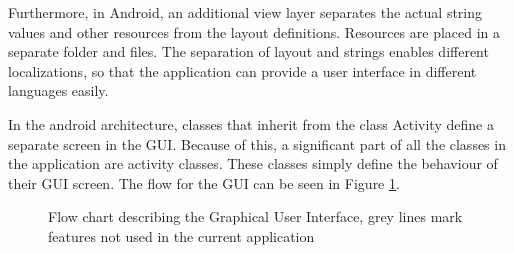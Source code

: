 Furthermore, in Android, an additional view layer separates the actual string values and other resources from the layout definitions. Resources are placed in a separate folder and files. The separation of layout and strings enables different localizations, so that the application can provide a user interface in different languages easily. 

In the android architecture, classes that inherit from the class Activity define a separate screen in the GUI. Because of this, a significant part of all the classes in the application are activity classes. These classes simply define the behaviour of their GUI screen. The flow for the GUI can be seen in Figure \ref{fig:GUIFlowchart}.



\begin{figure}
\setlength\fboxsep{0pt}
\setlength\fboxrule{1pt}\noindent{}
\caption{Flow chart describing the Graphical User Interface, grey lines mark features not used in the current application}
\label{fig:GUIFlowchart}
\end{figure}

\pagebreak


